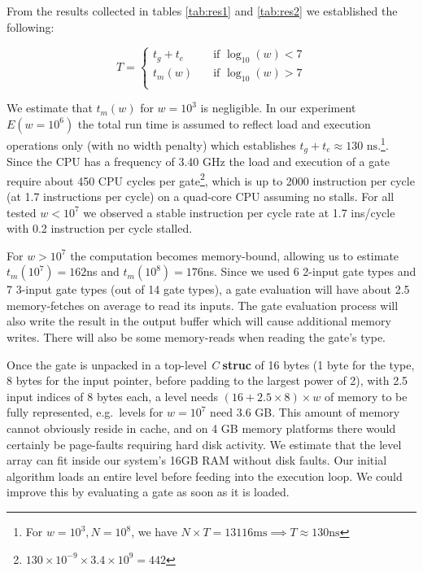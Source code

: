 \par
From the results collected in tables \ref{tab:res1} and \ref{tab:res2} we established the following:

\[ T =
  \begin{cases}
    t_g + t_e       & \quad \text{if } \log_{10}(w) < 7\\
    t_m(w) & \quad \text{if } \log_{10}(w) > 7\\
  \end{cases}
\]

We estimate that $t_m(w)$ for $w = 10^3$ is negligible. In our experiment $E(w = 10^6)$ the total run time is assumed to reflect load and execution operations only (with no width penalty) which establishes $t_g + t_e \approx 130\text{ ns}$.\footnote{ For $w = 10^3, N=10^8$, we have $N \times T = 13116 \text{ms} \implies T \approx 130 \text{ns}$ }. 
Since the CPU has a frequency of 3.40 GHz the load and execution of a gate require about 450 CPU cycles per gate\footnote{$130 \times 10^{-9} \times 3.4 \times 10^9 = 442$}, which is up to 2000 instruction per cycle (at 1.7 instructions per cycle) on a quad-core CPU assuming no stalls. For all tested $w < 10^7$ we observed a stable instruction per cycle rate at 1.7 ins/cycle with 0.2 instruction per cycle stalled.
\par
For $ w > 10^7$ the computation becomes memory-bound, allowing us to estimate $t_m(10^7) = 162$ns and $t_m(10^8) = 176$ns. Since we used 6 2-input gate types and 7 3-input gate types (out of 14 gate types), a gate evaluation will have about 2.5 memory-fetches on average to read its inputs. The gate evaluation process will also write the result in the output buffer which will cause additional memory writes. There will also be some memory-reads when reading the gate's type.
\par
Once the gate is unpacked in a top-level \textit{C} \textbf{struc} of 16 bytes (1 byte for the type, 8 bytes for the input pointer, before padding to the largest power of 2), with 2.5 input indices of 8 bytes each, a level needs $ (16 + 2.5 \times 8) \times w $ of memory to be fully represented, e.g.\ levels for $w = 10^7$ need 3.6 GB. This amount of memory cannot obviously reside in cache, and on 4 GB memory platforms there would certainly be page-faults requiring hard disk activity. We estimate that the level array can fit inside our system's 16GB RAM without disk faults. Our initial algorithm loads an entire level before feeding into the execution loop. We could improve this by evaluating a gate as soon as it is loaded.  
